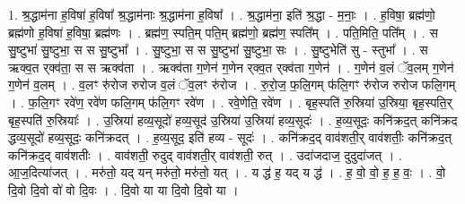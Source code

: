 \documentclass[17pt]{extarticle}
\begin{document}
1. श्र॒द्धाम॑ना ह॒विषा॑ ह॒विषा᳚ श्र॒द्धाम॑नाः श्र॒द्धाम॑ना ह॒विषा᳚ । . श्र॒द्धाम॑ना॒ इति॑ श्र॒द्धा - म॒नाः॒ । . ह॒विषा॒ ब्रह्म॑णो॒ ब्रह्म॑णो ह॒विषा॑ ह॒विषा॒ ब्रह्म॑णः । . ब्रह्म॑ण॒ स्पति॒म् पति॒म् ब्रह्म॑णो॒ ब्रह्म॑ण॒ स्पति᳚म् । . पति॒मिति॒ पति᳚म् । . स सु॒ष्टुभा॑ सु॒ष्टुभा॒ स स सु॒ष्टुभा᳚ । . सु॒ष्टुभा॒ स स सु॒ष्टुभा॑ सु॒ष्टुभा॒ सः । . सु॒ष्टुभेति॑ सु - स्तुभा᳚ । . स ऋक्व॒त र्‌क्व॑ता॒ स स ऋक्व॑ता । . ऋक्व॑ता ग॒णेन॑ ग॒णेन र्‌क्व॒त र्‌क्व॑ता ग॒णेन॑ । . ग॒णेन॑ व॒लं ॅव॒लम् ग॒णेन॑ ग॒णेन॑ व॒लम् । . व॒लꣳ रु॑रोज रुरोज व॒लं ॅव॒लꣳ रु॑रोज । . रु॒रो॒ज॒ फ॒लि॒गम् फ॑लि॒गꣳ रु॑रोज रुरोज फलि॒गम् । . फ॒लि॒गꣳ रवे॑ण॒ रवे॑ण फलि॒गम् फ॑लि॒गꣳ रवे॑ण । . रवे॒णेति॒ रवे॑ण । . बृह॒स्पति॑ रु॒स्रिया॑ उ॒स्रिया॒ बृह॒स्पति॒र् बृह॒स्पति॑ रु॒स्रियाः᳚ । . उ॒स्रिया॑ हव्य॒सूदो॑ हव्य॒सूद॑ उ॒स्रिया॑ उ॒स्रिया॑ हव्य॒सूदः॑ । . ह॒व्य॒सूदः॒ कनि॑क्रद॒त् कनि॑क्रद द्धव्य॒सूदो॑ हव्य॒सूदः॒ कनि॑क्रदत् । . ह॒व्य॒सूद॒ इति॑ हव्य - सूदः॑ । . कनि॑क्रद॒द् वाव॑शती॒र् वाव॑शतीः॒ कनि॑क्रद॒त् कनि॑क्रद॒द् वाव॑शतीः । . वाव॑शती॒ रुदुद् वाव॑शती॒र् वाव॑शती॒ रुत् । . उदा॑जदाज॒ दुदुदा॑जत् । . आ॒ज॒दित्या॑जत् । . मरु॑तो॒ यद् यन् मरु॑तो॒ मरु॑तो॒ यत् । . य द्ध॑ ह॒ यद् य द्ध॑ । . ह॒ वो॒ वो॒ ह॒ ह॒ वः॒ । . वो॒ दि॒वो दि॒वो वो॑ वो दि॒वः । . दि॒वो या या दि॒वो दि॒वो या । \newline
\end{document}
